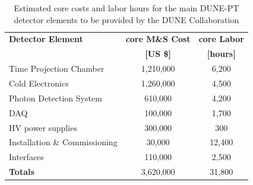 \begin{table}[h!]
\centering
\begin{tabular}{| l| c| c |}
\hline
\textbf{Detector Element} & \textbf{core M\&S Cost }  & \textbf{core Labor}  \\
 & \textbf{ [US \$]}  & \textbf{ [hours]}  \\ \hline
Time Projection Chamber & 1,210,000 & 6,200 \\
Cold Electronics & 1,260,000 & 4,500 \\
Photon Detection System & 610,000 & 4,200 \\
DAQ & 100,000 & 1,700 \\
HV power supplies & 300,000 & 300 \\
Installation \& Commissioning & 30,000 & 12,400 \\ 
Interfaces & 110,000 & 2,500 \\ \hline 
\textbf{Totals} & 3,620,000 & 31,800 \\ \hline
\end{tabular}
\caption{Estimated core costs and labor hours for the main DUNE-PT detector elements to be provided 
by the DUNE Collaboration}
\label{tab:cost}
\end{table}












